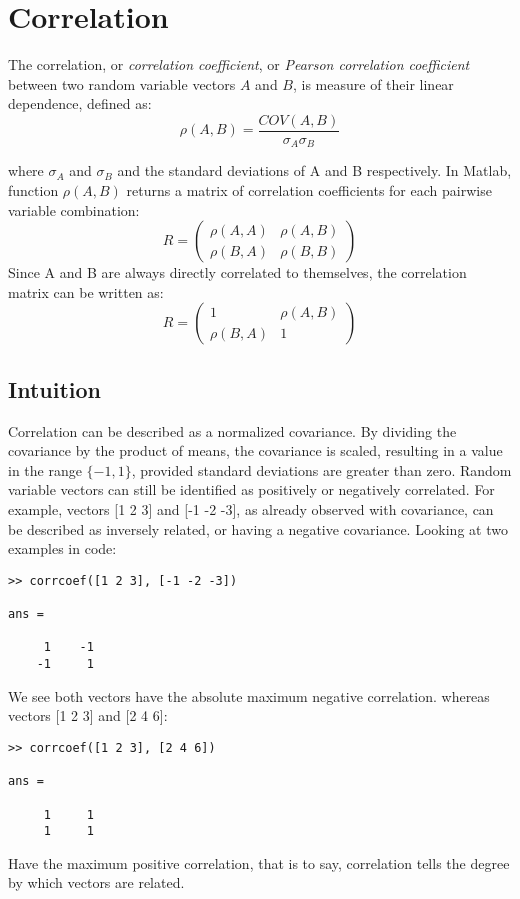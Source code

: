 \section{Correlation}

The correlation, or \textit{correlation coefficient}, or \textit{Pearson correlation coefficient}  between two random variable vectors $A$ and $B$, is measure of their linear dependence, defined as:
\begin{equation}
\rho(A,B) = \frac{COV(A,B)}{\sigma_A \sigma_B} \label{correlation}    
\end{equation}


where $\sigma_A$ and $\sigma_B$ and the standard deviations of A and B respectively. In Matlab, function $\rho(A,B)$ returns a matrix of correlation coefficients for each pairwise variable combination:
$$
R = 
\begin{pmatrix}
\rho(A,A) & \rho(A,B)\\
\rho(B,A) & \rho(B,B)
\end{pmatrix}
$$
Since A and B are always directly correlated to themselves, the correlation matrix can be written as:
$$
R = 
\begin{pmatrix}
1 & \rho(A,B)\\
\rho(B,A) & 1
\end{pmatrix}
$$
\subsection{Intuition}
Correlation can be described as a normalized covariance. By dividing the covariance by the product of means, the covariance is scaled, resulting in a value in the range $\{-1,1\}$, provided standard deviations are greater than zero.  
Random variable vectors can still be identified as positively or negatively correlated. For example, vectors [1 2 3] and [-1 -2 -3], as already observed with covariance, can be described as inversely related, or having a negative covariance. Looking at two examples in code:
\begin{verbatim}
>> corrcoef([1 2 3], [-1 -2 -3])

ans =

     1    -1
    -1     1
\end{verbatim}
We see both vectors have the absolute maximum negative correlation. whereas vectors [1 2 3] and [2 4 6]:
\begin{verbatim}
>> corrcoef([1 2 3], [2 4 6])

ans =

     1     1
     1     1
\end{verbatim}
Have the maximum positive correlation, that is to say, correlation tells the degree by which vectors are related.


